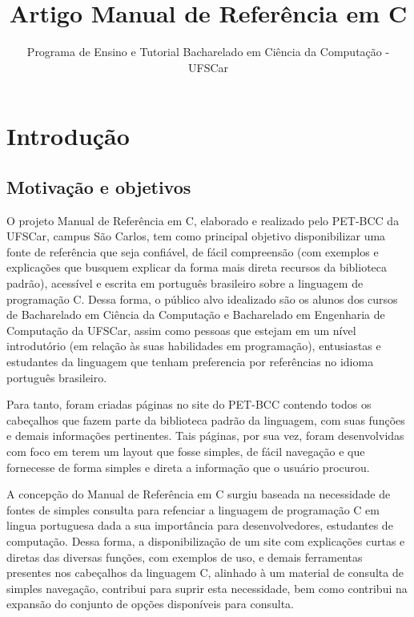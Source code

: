 \documentclass{article}
\title{\Large{\textbf{Artigo Manual de Referência em C}}}
\author{Programa de Ensino e Tutorial Bacharelado em Ciência da Computação - UFSCar}
\begin{document}
\maketitle

\section{Introdução}
\subsection{Motivação e objetivos}
O projeto Manual de Referência em C, elaborado e realizado pelo \acrfull{PET-BCC} da \acrfull{UFSCar}, campus São Carlos, tem como principal objetivo disponibilizar uma fonte de referência que seja confiável, de fácil compreensão (com exemplos e explicações que busquem explicar da forma mais direta recursos da biblioteca padrão), acessível e escrita em português brasileiro sobre a linguagem de programação C. Dessa forma, o público alvo idealizado são os alunos dos cursos de Bacharelado em Ciência da Computação e Bacharelado em Engenharia de Computação da \ac{UFSCar}, assim como pessoas que estejam em um nível introdutório (em relação às suas habilidades em programação), entusiastas e estudantes da linguagem que tenham preferencia por referências no idioma português brasileiro.

Para tanto, foram criadas páginas no site do PET-BCC contendo todos os cabeçalhos que fazem parte da biblioteca padrão da linguagem, com suas funções e demais informações pertinentes. Tais páginas, por sua vez, foram desenvolvidas com foco em terem um layout que fosse simples, de fácil navegação e que fornecesse de forma simples e direta a informação que o usuário procurou.

A concepção do Manual de Referência em C surgiu baseada na necessidade de fontes de simples consulta para refenciar a linguagem de programação C  em lingua portuguesa dada a sua importância para desenvolvedores, estudantes de computação. Dessa forma, a disponibilização de um site com explicações curtas e diretas das diversas funções, com exemplos de uso, e demais ferramentas presentes nos cabeçalhos da linguagem C, alinhado à um material de consulta de simples navegação, contribui para suprir esta necessidade, bem como contribui na expansão do conjunto de opções disponíveis para consulta.

\end{document}
